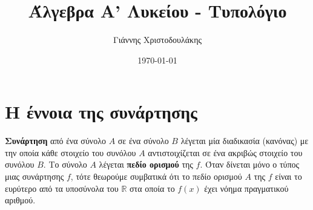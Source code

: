 \documentclass[11pt, a4paper, twoside, fleqn]{article}
\title{Άλγεβρα Α' Λυκείου - Τυπολόγιο}
\author{Γιάννης Χριστοδουλάκης}
\date{\selectlanguage{greek}\today}
\begin{document}
\maketitle
\newpage
\renewcommand{\contentsname}{Περιεχόμενα}
\tableofcontents
\newpage
\section{Η έννοια της συνάρτησης}
\begin{flushleft}
\textbf{Συνάρτηση} από ένα σύνολο \(A\) σε ένα σύνολο \(B\) λέγεται μία διαδικασία (κανόνας) με την οποία κάθε στοιχείο του συνόλου \(A\) αντιστοιχίζεται σε ένα ακριβώς στοιχείο του συνόλου \(B\). Το σύνολο \(A\) λέγεται \textbf{πεδίο ορισμού} της \(f\). Όταν δίνεται μόνο ο τύπος μιας συνάρτησης \(f\), τότε θεωρούμε συμβατικά ότι το πεδίο ορισμού \(A\) της \(f\) είναι το ευρύτερο από τα υποσύνολα του $\mathbb{R}$ στα οποία το \(f(x)\) έχει νόημα πραγματικού αριθμού.
\end{flushleft}
\end{document}
